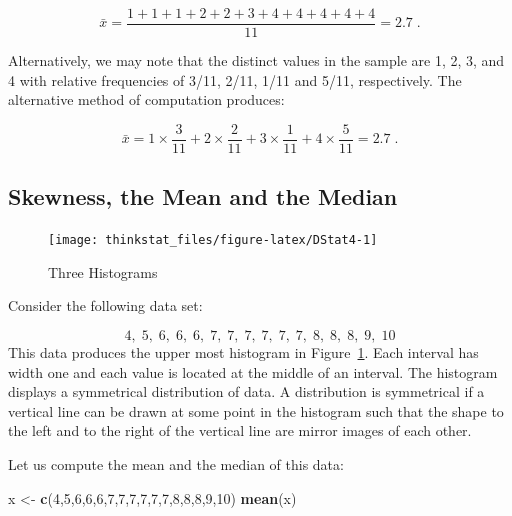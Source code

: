\documentclass[]{krantz}
\makeatletter
\newenvironment{Shaded}{\begin{snugshade}}{\end{snugshade}}
\newcommand{\KeywordTok}[1]{\textcolor[rgb]{0.13,0.29,0.53}{\textbf{#1}}}
\newcommand{\DecValTok}[1]{\textcolor[rgb]{0.00,0.00,0.81}{#1}}
\newcommand{\StringTok}[1]{\textcolor[rgb]{0.31,0.60,0.02}{#1}}
\newcommand{\NormalTok}[1]{#1}
\newenvironment{kframe}{%
\medskip{}
\setlength{\fboxsep}{.8em}
 \def\at@end@of@kframe{}%
 \ifinner\ifhmode%
  \def\at@end@of@kframe{\end{minipage}}%
  \begin{minipage}{\columnwidth}%
 \fi\fi%
 \def\FrameCommand##1{\hskip\@totalleftmargin \hskip-\fboxsep
 \colorbox{shadecolor}{##1}\hskip-\fboxsep
     \hskip-\linewidth \hskip-\@totalleftmargin \hskip\columnwidth}%
 \MakeFramed {\advance\hsize-\width
   \@totalleftmargin\z@ \linewidth\hsize
   \@setminipage}}%
 {\par\unskip\endMakeFramed%
 \at@end@of@kframe}
\renewenvironment{Shaded}{\begin{kframe}}{\end{kframe}}
\theoremstyle{definition}
\theoremstyle{definition}
\theoremstyle{definition}
\theoremstyle{remark}
\makeatother
\begin{document}
\[\bar x = \frac{1 + 1 + 1 + 2 + 2 + 3 + 4 + 4 + 4 + 4 + 4}{11} = 2.7\;.\]

Alternatively, we may note that the distinct values in the sample are 1,
2, 3, and 4 with relative frequencies of 3/11, 2/11, 1/11 and 5/11,
respectively. The alternative method of computation produces:

\[\bar x = 1\times \frac{3}{11} + 2 \times \frac{2}{11} + 3 \times \frac{1}{11} + 4 \times \frac{5}{11} = 2.7\;.\]

\subsection{Skewness, the Mean and the
Median}\label{skewness-the-mean-and-the-median}

\begin{figure}

{\centering \texttt{[image: thinkstat\_files/figure-latex/DStat4-1]} 

}

\caption{Three Histograms}\label{fig:DStat4}
\end{figure}

Consider the following data set:

\[4,\; 5,\; 6,\; 6,\; 6,\; 7,\; 7,\; 7,\; 7,\;  7,\;  7,\;  8,\;  8,\;  8,\;  9,\;  10\]
This data produces the upper most histogram in Figure~\ref{fig:DStat4}.
Each interval has width one and each value is located at the middle of
an interval. The histogram displays a symmetrical distribution of data.
A distribution is symmetrical if a vertical line can be drawn at some
point in the histogram such that the shape to the left and to the right
of the vertical line are mirror images of each other.

Let us compute the mean and the median of this data:

\begin{Shaded}
\begin{Highlighting}[]
\NormalTok{x <-}\StringTok{ }\KeywordTok{c}\NormalTok{(}\DecValTok{4}\NormalTok{,}\DecValTok{5}\NormalTok{,}\DecValTok{6}\NormalTok{,}\DecValTok{6}\NormalTok{,}\DecValTok{6}\NormalTok{,}\DecValTok{7}\NormalTok{,}\DecValTok{7}\NormalTok{,}\DecValTok{7}\NormalTok{,}\DecValTok{7}\NormalTok{,}\DecValTok{7}\NormalTok{,}\DecValTok{7}\NormalTok{,}\DecValTok{8}\NormalTok{,}\DecValTok{8}\NormalTok{,}\DecValTok{8}\NormalTok{,}\DecValTok{9}\NormalTok{,}\DecValTok{10}\NormalTok{)}
\KeywordTok{mean}\NormalTok{(x)}
\end{Highlighting}
\end{Shaded}
\end{document}

